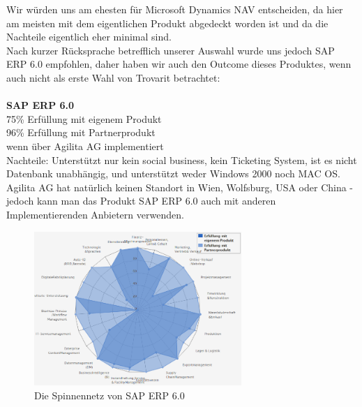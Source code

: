 \documentclass[12pt]{article}
\begin{document}
Wir würden uns am ehesten für Microsoft Dynamics NAV entscheiden, da hier am meisten mit dem eigentlichen Produkt abgedeckt worden ist und da die Nachteile eigentlich eher minimal sind.\\
Nach kurzer Rücksprache betrefflich unserer Auswahl wurde uns jedoch SAP ERP 6.0 empfohlen, daher haben wir auch den Outcome dieses Produktes, wenn auch nicht als erste Wahl von Trovarit betrachtet:
 \\ \\
\textbf{ SAP ERP 6.0}\\
		75\% Erfüllung mit eigenem Produkt\\
		96\% Erfüllung mit Partnerprodukt\\				
		wenn über Agilita AG implementiert\\
		Nachteile: Unterstützt nur kein social business, kein Ticketing System, ist es nicht Datenbank unabhängig, und unterstützt weder Windows 2000 noch MAC OS. Agilita AG hat natürlich keinen Standort in Wien, Wolfsburg, USA oder China - jedoch kann man das Produkt SAP ERP 6.0 auch mit anderen Implementierenden Anbietern verwenden.
		
\FloatBarrier
\begin{figure}[!h]
\centering
\includegraphics[width=0.7\textwidth]{images/SAPBussinesNEU}
\caption{Die Spinnennetz von SAP ERP 6.0}
\end{figure}\FloatBarrier

\end{document}
